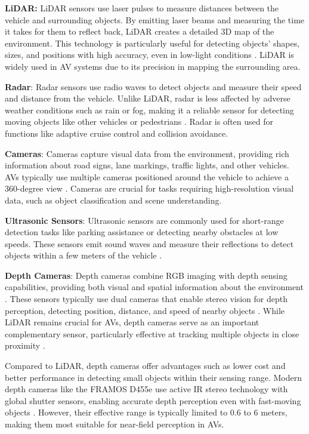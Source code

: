 \textbf{\ac{LiDAR}:}
    \ac{LiDAR} sensors use laser pulses to measure distances between the vehicle and surrounding objects.
    By emitting laser beams and measuring the time it takes for them to reflect back, \ac{LiDAR} creates
    a detailed 3D map of the environment. This technology is particularly useful for detecting objects'
    shapes, sizes, and positions with high accuracy, even in low-light conditions \cite{levinson2011towards}.
    \ac{LiDAR} is widely used in \ac{AV} systems due to its precision in mapping the surrounding area.

\textbf{Radar}:
    Radar sensors use radio waves to detect objects and measure their speed and distance from the vehicle.
    Unlike \ac{LiDAR}, radar is less affected by adverse weather conditions such as rain or fog, making it a
    reliable sensor for detecting moving objects like other vehicles or pedestrians \cite{patole2017automotive}.
    Radar is often used for functions like adaptive cruise control and collision avoidance.

    \textbf{Cameras}:
    Cameras capture visual data from the environment, providing rich information about road signs,
    lane markings, traffic lights, and other vehicles. \acp{AV} typically use multiple cameras positioned
    around the vehicle to achieve a 360-degree view \cite{geiger2012we}. Cameras are crucial for tasks requiring
    high-resolution visual data, such as object classification and scene understanding.

    \textbf{Ultrasonic Sensors}:
    Ultrasonic sensors are commonly used for short-range detection tasks like parking assistance or detecting nearby
    obstacles at low speeds. These sensors emit sound waves and measure their reflections to detect objects within
    a few meters of the vehicle \cite{zhang2018ultrasonic}.

    \textbf{Depth Cameras}:
    Depth cameras combine RGB imaging with depth sensing capabilities, providing both visual and spatial information about the environment \cite{aivero2024depth}.
    These sensors typically use dual cameras that enable stereo vision for depth perception, detecting position, distance, and speed of nearby objects \cite{aivero2024depth}.
    While \ac{LiDAR} remains crucial for \acp{AV}, depth cameras serve as an important complementary sensor, particularly effective at tracking multiple objects in close proximity \cite{argui2023mixed}.

    Compared to \ac{LiDAR}, depth cameras offer advantages such as lower cost and better performance in detecting small objects within their sensing range. Modern depth cameras like the FRAMOS D455e use active IR stereo technology with global shutter sensors, enabling accurate depth perception even with fast-moving objects \cite{framos2024d455e}. However, their effective range is typically limited to 0.6 to 6 meters, making them most suitable for near-field perception in \acp{AV}.

